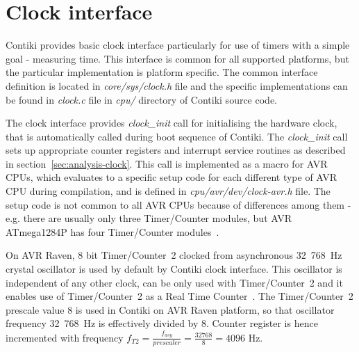 
\section{Clock interface}
Contiki provides basic clock interface particularly for use of timers
with a simple goal - measuring time.
This interface is common for all supported platforms,
but the particular implementation is platform specific.
The common interface definition is located in {\it{core/sys/clock.h}} file
and the specific implementations can be found in {\it{clock.c}} file
in {\it{cpu/}} directory of Contiki source code.

The clock interface provides {\it{clock\_init}} call for initialising the hardware clock,
that is automatically called during boot sequence of Contiki.
The {\it{clock\_init}} call sets up
appropriate counter registers and interrupt service routines as described in section~\ref{sec:analysis-clock}.
This call is implemented as a macro for AVR CPUs, which evaluates to a specific setup code for each
different type of AVR CPU during compilation, and is defined in {\it{cpu/avr/dev/clock-avr.h}} file.
The setup code is not common to all AVR CPUs because of differences among them - e.g. there are usually
only three Timer/Counter modules, but AVR ATmega1284P has four Timer/Counter modules~\cite{avr-datasheet}.

On AVR Raven, 8 bit Timer/Counter~2 clocked from asynchronous 32~768~Hz crystal oscillator
is used by default by Contiki clock interface.
This oscillator is independent of any other clock,
can be only used with Timer/Counter~2 and it
enables use of Timer/Counter~2 as a Real Time Counter~\cite{avr-datasheet}.
The Timer/Counter~2 prescale value 8 is used in Contiki on AVR Raven platform,
so that oscillator frequency 32~768~Hz is effectively divided by 8.
Counter register is hence incremented with frequency
$f_{T2} = {\frac{f_{asy}}{prescaler}} = {\frac{32768}{8}} = 4096$ Hz.


